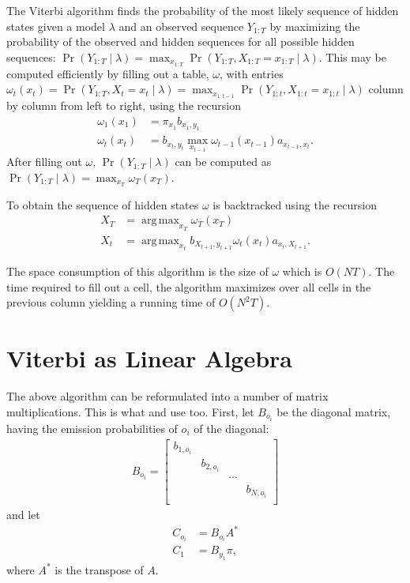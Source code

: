 \documentclass[11pt,twoside,a4,danish,english,report]{memoir}
\DeclareMathOperator*{\argmax}{arg\,max}
\begin{document}
The Viterbi algorithm finds the probability of the most likely sequence of
hidden states given a model $\lambda$ and an observed sequence $Y_{1:T}$ by
maximizing the probability of the observed and hidden sequences for all
possible hidden sequences: $\Pr(Y_{1:T} \mid \lambda) = \max_{x_{1:T}}
\Pr(Y_{1:T}, X_{1:T} = x_{1:T} \mid \lambda)$. This may be computed efficiently
by filling out a table, $\omega$, with entries $\omega_t(x_t) = \Pr(Y_{1:T},
X_t = x_t \mid \lambda) = \max_{x_{1:t-1}} \Pr(Y_{1:t}, X_{1:t} = x_{1:t} \mid
\lambda)$ column by column from left to right, using the recursion
\begin{align*}
  \omega_1(x_1) &= \pi_{x_1} b_{x_1, y_1} \\
  \omega_t(x_t) &= b_{x_t, y_t} \max_{x_{t - 1}} \omega_{t - 1}(x_{t - 1})
                  a_{x_{t - 1}, x_t}.
\end{align*}
After filling out $\omega$, $\Pr(Y_{1:T} \mid \lambda)$ can be computed as
$\Pr(Y_{1:T} \mid \lambda) = \max_{x_T} \omega_T(x_T)$.

To obtain the sequence of hidden states $\omega$ is backtracked using the
recursion
\begin{align*}
  X_T &= \argmax_{x_T} \omega_T(x_T) \\
  X_{t} &= \argmax_{x_{t}} b_{X_{t + 1}, y_{t + 1}} \omega_{t}(x_t) a_{x_t, X_{t + 1}}.
\end{align*}

The space consumption of this algorithm is the size of $\omega$ which is $O(N
T)$. The time required to fill out a cell, the algorithm maximizes over all
cells in the previous column yielding a running time of $O(N^2 T)$.

\section{Viterbi as Linear Algebra}
\label{sec:algorithm-as-linear}

The above algorithm can be reformulated into a number of matrix
multiplications. This is what \citet{sand2013ziphmmlib} and
\citet{lifshits2009speeding} use too. First, let $B_{o_i}$ be the diagonal
matrix, having the emission probabilities of $o_i$ of the diagonal:
\begin{align*}
  B_{o_i} =
  \begin{bmatrix}
    b_{1, o_i} &            &        &            \\
               & b_{2, o_i} &        &            \\
               &            & \cdots &            \\
               &            &        & b_{N, o_i} \\
  \end{bmatrix}
\end{align*}
and let
\begin{align*}
  C_{o_i} &= B_{o_i} A^* \\
  C_1 &= B_{y_1} \pi,
\end{align*}
where $A^*$ is the transpose of $A$.
\end{document}
